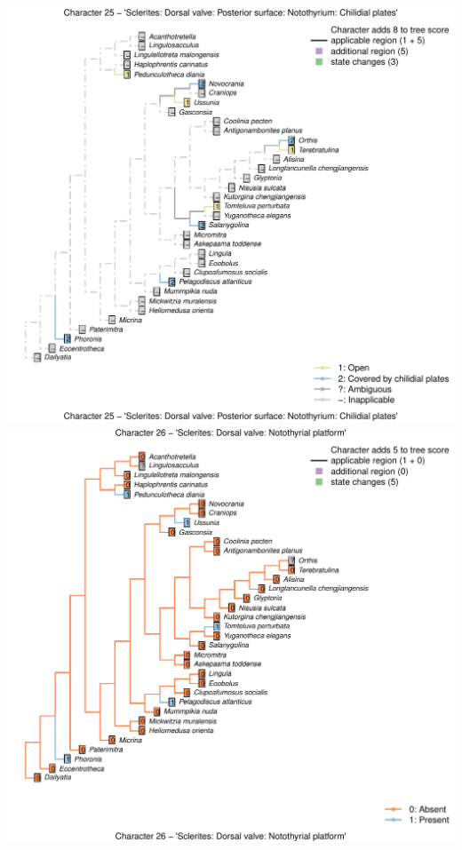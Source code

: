 \documentclass[]{book}
\theoremstyle{definition}
\theoremstyle{definition}
\theoremstyle{definition}
\theoremstyle{remark}
\begin{document}
\includegraphics{Brachiopod_phylogeny_files/figure-latex/unnamed-chunk-4-25.pdf}
\includegraphics{Brachiopod_phylogeny_files/figure-latex/unnamed-chunk-4-26.pdf}
\end{document}
